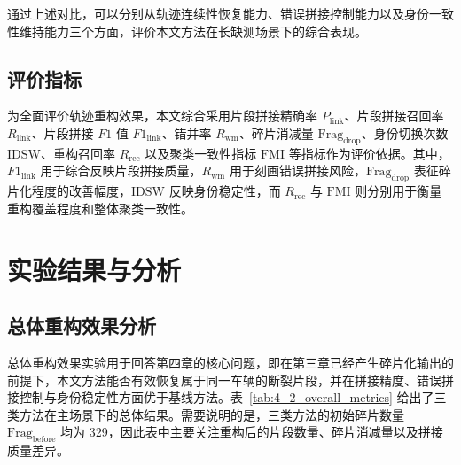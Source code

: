 \documentclass{xdupgthesis}
\begin{document}
通过上述对比，可以分别从轨迹连续性恢复能力、错误拼接控制能力以及身份一致性维持能力三个方面，评价本文方法在长缺测场景下的综合表现。

\subsection{评价指标}

为全面评价轨迹重构效果，本文综合采用片段拼接精确率 $P_{\mathrm{link}}$、片段拼接召回率 $R_{\mathrm{link}}$、片段拼接 $F1$ 值 $F1_{\mathrm{link}}$、错并率 $R_{\mathrm{wm}}$、碎片消减量 $\mathrm{Frag}_{\mathrm{drop}}$、身份切换次数 $\mathrm{IDSW}$、重构召回率 $R_{\mathrm{rec}}$ 以及聚类一致性指标 $\mathrm{FMI}$ 等指标作为评价依据。其中，$F1_{\mathrm{link}}$ 用于综合反映片段拼接质量，$R_{\mathrm{wm}}$ 用于刻画错误拼接风险，$\mathrm{Frag}_{\mathrm{drop}}$ 表征碎片化程度的改善幅度，$\mathrm{IDSW}$ 反映身份稳定性，而 $R_{\mathrm{rec}}$ 与 $\mathrm{FMI}$ 则分别用于衡量重构覆盖程度和整体聚类一致性。

\section{实验结果与分析}

\subsection{总体重构效果分析}

总体重构效果实验用于回答第四章的核心问题，即在第三章已经产生碎片化输出的前提下，本文方法能否有效恢复属于同一车辆的断裂片段，并在拼接精度、错误拼接控制与身份稳定性方面优于基线方法。表~\ref{tab:4_2_overall_metrics} 给出了三类方法在主场景下的总体结果。需要说明的是，三类方法的初始碎片数量 $\mathrm{Frag}_{\mathrm{before}}$ 均为 329，因此表中主要关注重构后的片段数量、碎片消减量以及拼接质量差异。

\begin{table}[H]
	\centering
	\caption{总体重构效果对比}
	\label{tab:4_2_overall_metrics}
\end{table}
\end{document}
